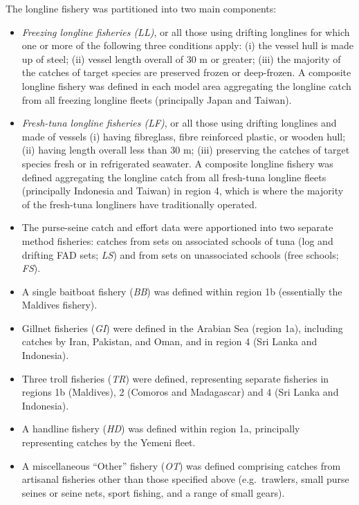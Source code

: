 \documentclass[
]{scrartcl}
\begin{document}
The longline fishery was partitioned into two main components:

\begin{itemize}
\item
  \emph{Freezing longline fisheries (LL)}, or all those using drifting
  longlines for which one or more of the following three conditions
  apply: (i) the vessel hull is made up of steel; (ii) vessel length
  overall of 30 m or greater; (iii) the majority of the catches of
  target species are preserved frozen or deep-frozen. A composite
  longline fishery was defined in each model area aggregating the
  longline catch from all freezing longline fleets (principally Japan
  and Taiwan).
\item
  \emph{Fresh-tuna longline fisheries (LF)}, or all those using drifting
  longlines and made of vessels (i) having fibreglass, fibre reinforced
  plastic, or wooden hull; (ii) having length overall less than 30 m;
  (iii) preserving the catches of target species fresh or in
  refrigerated seawater. A composite longline fishery was defined
  aggregating the longline catch from all fresh-tuna longline fleets
  (principally Indonesia and Taiwan) in region 4, which is where the
  majority of the fresh-tuna longliners have traditionally operated.
\item
  The purse-seine catch and effort data were apportioned into two
  separate method fisheries: catches from sets on associated schools of
  tuna (log and drifting FAD sets; \emph{LS}) and from sets on
  unassociated schools (free schools; \emph{FS}).
\item
  A single baitboat fishery (\emph{BB}) was defined within region 1b
  (essentially the Maldives fishery).
\item
  Gillnet fisheries (\emph{GI}) were defined in the Arabian Sea (region
  1a), including catches by Iran, Pakistan, and Oman, and in region 4
  (Sri Lanka and Indonesia).
\item
  Three troll fisheries (\emph{TR}) were defined, representing separate
  fisheries in regions 1b (Maldives), 2 (Comoros and Madagascar) and 4
  (Sri Lanka and Indonesia).
\item
  A handline fishery (\emph{HD}) was defined within region 1a,
  principally representing catches by the Yemeni fleet.
\item
  A miscellaneous ``Other'' fishery (\emph{OT}) was defined comprising
  catches from artisanal fisheries other than those specified above
  (e.g.~trawlers, small purse seines or seine nets, sport fishing, and a
  range of small gears).
\end{itemize}
\end{document}
